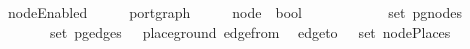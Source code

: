 \ nodeEnabled\ {\isacharcolon}{\isacharcolon}\ {\isachardoublequoteopen}{\isacharparenleft}\ \ \ \ port{\isacharunderscore}graph\ {\isasymRightarrow}\ {\isacharparenleft}\ \ \ \ node\ {\isasymRightarrow}\ bool{\isachardoublequoteclose}\isanewline
\ \ \ {\isachardoublequoteopen}\ \ {\isasymequiv}\isanewline
\ \ \ \ \ {\isasymin}\ set\ {\isacharparenleft}pg{\isacharunderscore}nodes\ \ {\isasymand}\isanewline
\ \ \ \ {\isacharparenleft}{\isasymforall}\ \ {\isasymin}\ set\ {\isacharparenleft}pg{\isacharunderscore}edges\ \ {\isasymand}\ place{\isacharunderscore}ground\ {\isacharparenleft}edge{\isacharunderscore}from\ \isanewline
{}\ edge{\isacharunderscore}to\ \ {\isasymnotin}\ set\ {\isacharparenleft}nodePlaces\ 

